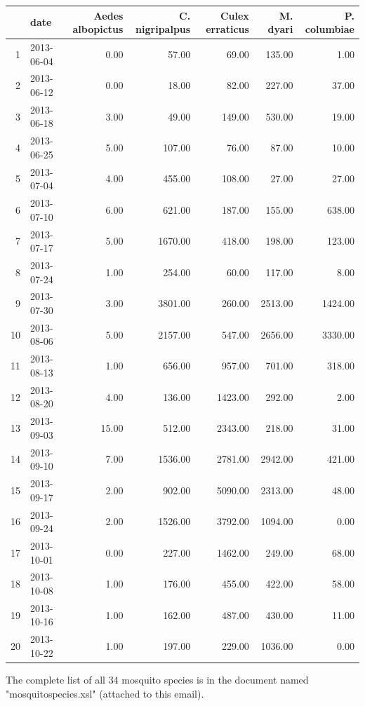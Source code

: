 \documentclass{article}
\begin{document}
\begin{center}
\begin{small}
\begin{table}[ht]
\centering
\begin{tabular}{rlrrrrr}
  \hline
 & date & Aedes albopictus & C. nigripalpus & Culex  erraticus & M. dyari & P. columbiae \\ 
  \hline
1 & 2013-06-04 & 0.00 & 57.00 & 69.00 & 135.00 & 1.00 \\ 
  2 & 2013-06-12 & 0.00 & 18.00 & 82.00 & 227.00 & 37.00 \\ 
  3 & 2013-06-18 & 3.00 & 49.00 & 149.00 & 530.00 & 19.00 \\ 
  4 & 2013-06-25 & 5.00 & 107.00 & 76.00 & 87.00 & 10.00 \\ 
  5 & 2013-07-04 & 4.00 & 455.00 & 108.00 & 27.00 & 27.00 \\ 
  6 & 2013-07-10 & 6.00 & 621.00 & 187.00 & 155.00 & 638.00 \\ 
  7 & 2013-07-17 & 5.00 & 1670.00 & 418.00 & 198.00 & 123.00 \\ 
  8 & 2013-07-24 & 1.00 & 254.00 & 60.00 & 117.00 & 8.00 \\ 
  9 & 2013-07-30 & 3.00 & 3801.00 & 260.00 & 2513.00 & 1424.00 \\ 
  10 & 2013-08-06 & 5.00 & 2157.00 & 547.00 & 2656.00 & 3330.00 \\ 
  11 & 2013-08-13 & 1.00 & 656.00 & 957.00 & 701.00 & 318.00 \\ 
  12 & 2013-08-20 & 4.00 & 136.00 & 1423.00 & 292.00 & 2.00 \\ 
  13 & 2013-09-03 & 15.00 & 512.00 & 2343.00 & 218.00 & 31.00 \\ 
  14 & 2013-09-10 & 7.00 & 1536.00 & 2781.00 & 2942.00 & 421.00 \\ 
  15 & 2013-09-17 & 2.00 & 902.00 & 5090.00 & 2313.00 & 48.00 \\ 
  16 & 2013-09-24 & 2.00 & 1526.00 & 3792.00 & 1094.00 & 0.00 \\ 
  17 & 2013-10-01 & 0.00 & 227.00 & 1462.00 & 249.00 & 68.00 \\ 
  18 & 2013-10-08 & 1.00 & 176.00 & 455.00 & 422.00 & 58.00 \\ 
  19 & 2013-10-16 & 1.00 & 162.00 & 487.00 & 430.00 & 11.00 \\ 
  20 & 2013-10-22 & 1.00 & 197.00 & 229.00 & 1036.00 & 0.00 \\ 
   \hline
\end{tabular}
\end{table}


\end{small}


\end{center}
The complete list of all 34 mosquito species is in the document named "mosquitospecies.xsl" (attached to this email).
\end{document}
